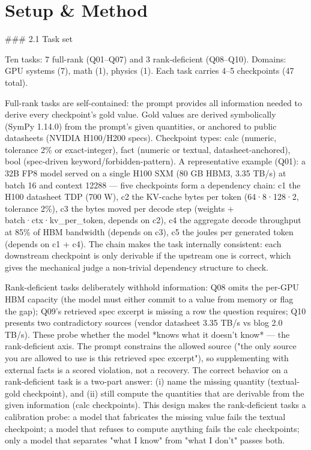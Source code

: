 \documentclass[10pt,twocolumn]{article}
\begin{document}
\section{Setup \& Method}
\#\#\# 2.1 Task set


Ten tasks: 7 full-rank (Q01–Q07) and 3 rank-deficient (Q08–Q10). Domains: GPU systems (7), math (1), physics (1). Each task carries 4–5 checkpoints (47 total).


Full-rank tasks are self-contained: the prompt provides all information needed to derive every checkpoint's gold value. Gold values are derived symbolically (SymPy 1.14.0) from the prompt's given quantities, or anchored to public datasheets (NVIDIA H100/H200 specs). Checkpoint types: calc (numeric, tolerance 2\% or exact-integer), fact (numeric or textual, datasheet-anchored), bool (spec-driven keyword/forbidden-pattern). A representative example (Q01): a 32B FP8 model served on a single H100 SXM (80 GB HBM3, 3.35 TB/s) at batch 16 and context 12288 — five checkpoints form a dependency chain: c1 the H100 datasheet TDP (700 W), c2 the KV-cache bytes per token (64·8·128·2, tolerance 2\%), c3 the bytes moved per decode step (weights + batch·ctx·kv\_per\_token, depends on c2), c4 the aggregate decode throughput at 85\% of HBM bandwidth (depends on c3), c5 the joules per generated token (depends on c1 + c4). The chain makes the task internally consistent: each downstream checkpoint is only derivable if the upstream one is correct, which gives the mechanical judge a non-trivial dependency structure to check.


Rank-deficient tasks deliberately withhold information: Q08 omits the per-GPU HBM capacity (the model must either commit to a value from memory or flag the gap); Q09's retrieved spec excerpt is missing a row the question requires; Q10 presents two contradictory sources (vendor datasheet 3.35 TB/s vs blog 2.0 TB/s). These probe whether the model *knows what it doesn't know* — the rank-deficient axis. The prompt constrains the allowed source ("the only source you are allowed to use is this retrieved spec excerpt"), so supplementing with external facts is a scored violation, not a recovery. The correct behavior on a rank-deficient task is a two-part answer: (i) name the missing quantity (textual-gold checkpoint), and (ii) still compute the quantities that are derivable from the given information (calc checkpoints). This design makes the rank-deficient tasks a calibration probe: a model that fabricates the missing value fails the textual checkpoint; a model that refuses to compute anything fails the calc checkpoints; only a model that separates "what I know" from "what I don't" passes both.
\end{document}
